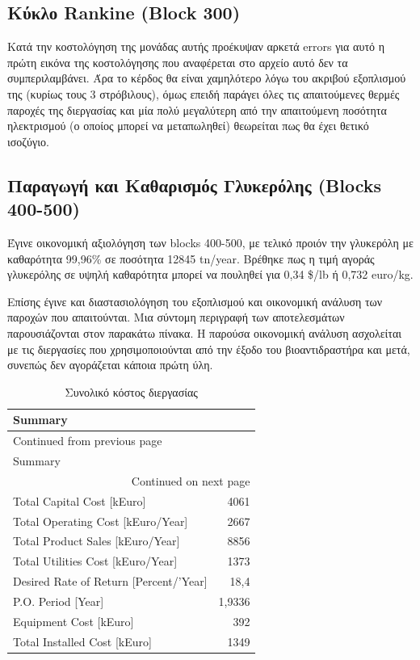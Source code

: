 \documentclass[11pt]{article}
\begin{document}
\subsection{Κύκλο Rankine (Block 300)}
\label{sec:orgb6a36fd}
Κατά την κοστολόγηση της μονάδας αυτής προέκυψαν αρκετά errors για αυτό η πρώτη εικόνα της κοστολόγησης που αναφέρεται στο αρχείο αυτό δεν τα συμπεριλαμβάνει. Άρα το κέρδος θα είναι χαμηλότερο λόγω του ακριβού εξοπλισμού της (κυρίως τους 3 στρόβιλους), όμως επειδή παράγει όλες τις απαιτούμενες θερμές παροχές της διεργασίας και μία πολύ μεγαλύτερη από την απαιτούμενη ποσότητα ηλεκτρισμού (ο οποίος μπορεί να μεταπωληθεί) θεωρείται πως θα έχει θετικό ισοζύγιο.

\subsection{Παραγωγή και Καθαρισμός Γλυκερόλης (Blocks 400-500)}
\label{sec:org52ee46b}
Έγινε οικονομική αξιολόγηση των blocks 400-500, με τελικό προιόν την
γλυκερόλη με καθαρότητα 99,96\% σε ποσότητα 12845 tn/year. Βρέθηκε
πως η τιμή αγοράς γλυκερόλης σε υψηλή καθαρότητα μπορεί να πουληθεί
για 0,34 \$/lb ή 0,732 euro/kg.

Επίσης έγινε και διαστασιολόγηση του εξοπλισμού και οικονομική ανάλυση
των παροχών που απαιτούνται. Μια σύντομη περιγραφή των αποτελεσμάτων
παρουσιάζονται στον παρακάτω πίνακα. Η παρούσα οικονομική ανάλυση
ασχολείται με τις διεργασίες που χρησιμοποιούνται από την έξοδο του
βιοαντιδραστήρα και μετά, συνεπώς δεν αγοράζεται κάποια πρώτη ύλη.

\begin{longtable}{lr}
\caption{Συνολικό κόστος διεργασίας}
\\
Summary & \\
\hline
\endfirsthead
\multicolumn{2}{l}{Continued from previous page} \\
\hline

Summary &  \\

\hline
\endhead
\hline\multicolumn{2}{r}{Continued on next page} \\
\endfoot
\endlastfoot
\hline
Total Capital Cost [kEuro] & 4061\\
Total Operating Cost [kEuro/Year] & 2667\\
Total Product Sales [kEuro/Year] & 8856\\
Total Utilities Cost [kEuro/Year] & 1373\\
Desired Rate of Return [Percent/'Year] & 18,4\\
P.O. Period [Year] & 1,9336\\
Equipment Cost [kEuro] & 392\\
Total Installed Cost [kEuro] & 1349\\
\end{longtable}
\end{document}
